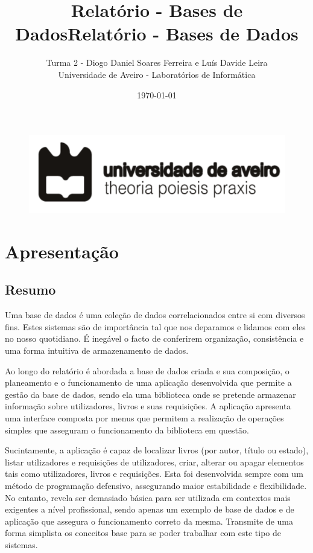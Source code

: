 \documentclass[11pt,openany,twoside]{report}
\title{\textbf{Relatório - Bases de Dados}}
\begin{document}
\begin{titlepage}
\begin{figure}
\title{\textbf{Relatório - Bases de Dados}}
\author{Turma 2 - Diogo Daniel Soares Ferreira e Luís Davide Leira\\\vspace{3cm}
Universidade de Aveiro - Laboratórios de Informática}
\date{\today}
 \includegraphics[scale=1.5]{ua_logo.png}
\end{figure}
\end{titlepage}

\maketitle
\tableofcontents
\listoffigures

\part{Apresentação}

\chapter{Resumo}

Uma base de dados é uma coleção de dados correlacionados entre si com diversos fins. Estes sistemas são de importância tal que nos deparamos e lidamos com eles no nosso quotidiano. É inegável o facto de conferirem organização, consistência e uma forma intuitiva de armazenamento de dados. 

Ao longo do relatório é abordada a base de dados criada e sua composição, o planeamento e o funcionamento de uma aplicação desenvolvida que permite a gestão da base de dados, sendo ela uma biblioteca onde se pretende armazenar informação sobre utilizadores, livros e suas requisições. A aplicação apresenta uma interface composta por menus que permitem a realização de operações simples que asseguram o funcionamento da biblioteca em questão.

Sucintamente, a aplicação é capaz de localizar livros (por autor, título ou estado), listar utilizadores e requisições de utilizadores, criar, alterar ou apagar elementos tais como
utilizadores, livros e requisições. Esta foi desenvolvida sempre com um método de programação defensivo, assegurando maior estabilidade e flexibilidade. No entanto, revela ser demasiado básica para ser utilizada em contextos mais exigentes a nível profissional, sendo apenas um exemplo de base de dados e de aplicação que assegura o funcionamento correto da mesma. Transmite de uma forma simplista os conceitos base para se poder trabalhar com este tipo de sistemas.
\end{document}
